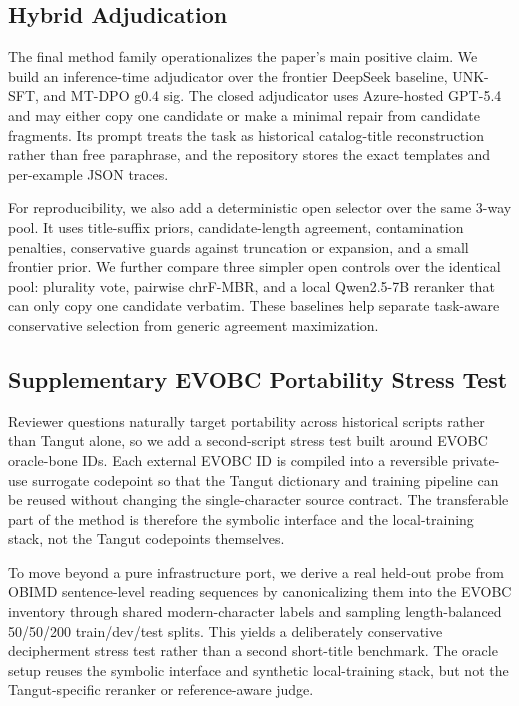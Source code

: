 \subsection{Hybrid Adjudication}

The final method family operationalizes the paper's main positive claim. We build an inference-time adjudicator over the frontier DeepSeek baseline, UNK-SFT, and MT-DPO g0.4 sig. The closed adjudicator uses Azure-hosted GPT-5.4 and may either copy one candidate or make a minimal repair from candidate fragments. Its prompt treats the task as historical catalog-title reconstruction rather than free paraphrase, and the repository stores the exact templates and per-example JSON traces.

For reproducibility, we also add a deterministic open selector over the same 3-way pool. It uses title-suffix priors, candidate-length agreement, contamination penalties, conservative guards against truncation or expansion, and a small frontier prior. We further compare three simpler open controls over the identical pool: plurality vote, pairwise chrF-MBR, and a local Qwen2.5-7B reranker that can only copy one candidate verbatim. These baselines help separate task-aware conservative selection from generic agreement maximization.

\subsection{Supplementary EVOBC Portability Stress Test}

Reviewer questions naturally target portability across historical scripts rather than Tangut alone, so we add a second-script stress test built around EVOBC oracle-bone IDs. Each external EVOBC ID is compiled into a reversible private-use surrogate codepoint so that the Tangut dictionary and training pipeline can be reused without changing the single-character source contract. The transferable part of the method is therefore the symbolic interface and the local-training stack, not the Tangut codepoints themselves.

To move beyond a pure infrastructure port, we derive a real held-out probe from OBIMD sentence-level reading sequences by canonicalizing them into the EVOBC inventory through shared modern-character labels and sampling length-balanced 50/50/200 train/dev/test splits. This yields a deliberately conservative decipherment stress test rather than a second short-title benchmark. The oracle setup reuses the symbolic interface and synthetic local-training stack, but not the Tangut-specific reranker or reference-aware judge.

